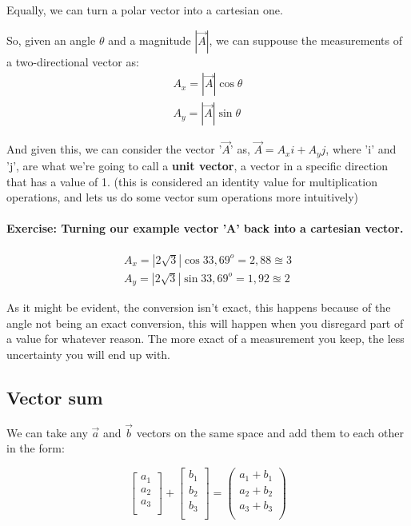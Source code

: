 \documentclass[11pt,fleqn]{book} %
\begin{document}
\noindent Equally, we can turn a polar vector into a cartesian one. 

So, given an angle $ \theta $ and a magnitude $ |\vec{A}| $, we can suppouse the measurements of a two-directional vector as:
\begin{gather}
    A_x  = |\vec{A}| \cos \theta \\
    A_y = |\vec{A}| \sin \theta
\end{gather}

And given this, we can consider the vector '$\vec{A}$' as, $ \vec{A} = A_x i + A_y j $, where 'i' and
'j', are what we're going to call a \textbf{unit vector}, a vector in a specific direction that has a value of 1.
(this is considered an identity value for multiplication operations, and lets us do some vector sum 
operations more intuitively)


\paragraph{Exercise: Turning our example vector 'A' back into a cartesian vector.}
\begin{gather}
    A_x  = |2\sqrt{3}| \cos 33,69^o = 2,88 \approxeq 3 \\
    A_y = |2\sqrt{3}| \sin 33,69^o = 1,92  \approxeq 2
\end{gather}

As it might be evident, the conversion isn't exact, this happens because of the 
angle not being an exact conversion, this will happen when you disregard part of a value
for whatever reason. The more exact of a measurement you keep, the less uncertainty you will
end up with.

\subsection{Vector sum}


We can take any $ \vec{a} $ and $ \vec{b} $ vectors on the same space and add them to each other
in the form:

\begin{equation}
    \begin{bmatrix}
        a_1 \\
        a_2 \\
        a_3 \\
    \end{bmatrix}
    +
    \begin{bmatrix}
        b_1 \\
        b_2 \\
        b_3 \\
    \end{bmatrix}
    = 
    \begin{pmatrix}
        a_1 + b_1\\
        a_2 + b_2\\
        a_3 + b_3\\
    \end{pmatrix}
\end{equation}
\end{document}

